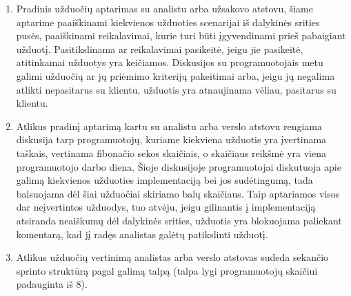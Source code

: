 \documentclass{VUMIFPSkursinis}
\begin{document}
	\begin{enumerate}
		\item{
			Pradinis užduočių aptarimas su analistu arba užsakovo atstovu, šiame aptarime paaiškinami kiekvienos užduoties scenarijai iš dalykinės srities pusės, paaiškinami reikalavimai, kurie turi būti įgyvendinami prieš pabaigiant užduotį.
			Pasitikslinama ar reikalavimai pasikeitė, jeigu jie pasikeitė, atitinkamai užduotys yra keičiamos.
			Diskusijos su programuotojais metu galimi užduočių ar jų priėmimo kriterijų pakeitimai arba, jeigu jų negalima atlikti nepasitarus su klientu, užduotis yra atnaujinama vėliau, pasitarus su klientu.
		}
		\item{
			Atlikus pradinį aptarimą kartu su analistu arba verslo atstovu rengiama diskusija tarp programuotojų, kuriame kiekviena užduotis yra įvertinama taškais, vertinama fibonačio sekos skaičiais, o skaičiaus reikšmė yra viena programuotojo darbo diena.
			Šioje diskusijoje programuotojai diskutuoja apie galimą kiekvienos užduoties implementaciją bei jos sudėtingumą, tada balsuojama dėl šiai užduočiai skiriamo balų skaičiaus.
			Taip aptariamos visos dar neįvertintos užduodys, tuo atvėju, jeigu gilinantis į implementaciją atsiranda neaiškumų dėl dalykinės srities, užduotis yra blokuojama paliekant komentarą, kad jį radęs analistas galėtų patikslinti užduotį.
		}
		\item{
			Atlikus užduočių vertinimą analistas arba verslo atstovas sudeda sekančio sprinto struktūrą pagal galimą talpą (talpa lygi programuotojų skaičiui padauginta iš 8).
		}
	\end{enumerate}
\end{document}

